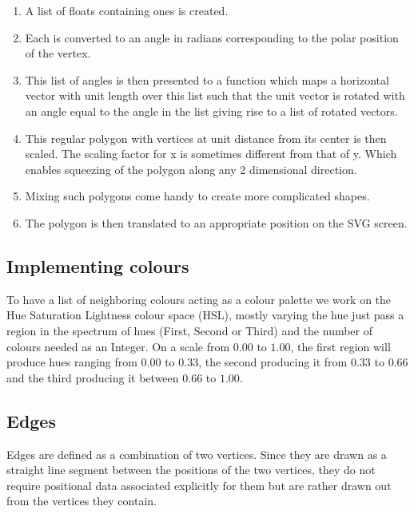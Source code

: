 \begin{enumerate}
\item A list of floats containing ones is created. 

\item Each is converted to an angle in radians corresponding
to the polar position of the vertex. 

\item This list of angles is then presented to
a function which maps a horizontal vector with unit length over this list
such that the unit vector is rotated with an angle equal to the angle in the
list giving rise to a list of rotated vectors.

\item This regular polygon with vertices at unit distance from its center is
then scaled. The scaling factor for x is sometimes different from that of y.
Which enables squeezing of the polygon along any 2 dimensional direction.

\item Mixing such polygons come handy to create more complicated shapes.

\item The polygon is then translated to an appropriate position on the SVG screen.

\end{enumerate}

\subsection{Implementing colours}
To have a list of neighboring colours acting as a colour palette we work on the
Hue Saturation Lightness colour space (HSL), mostly varying the hue just pass a
region in the spectrum of hues (First, Second or Third) and the number of
colours needed as an Integer. On a scale from $0.00$ to $1.00$, the first region
will produce hues ranging from $0.00$ to $0.33$, the second producing it from
$0.33$ to $0.66$ and the third producing it between $0.66$ to $1.00$.

\subsection{Edges}
Edges are defined as a combination of two vertices. Since they are drawn as a
straight line segment between the positions of the two vertices, they do not require
positional data associated explicitly for them but are rather drawn out from the vertices
they contain.

